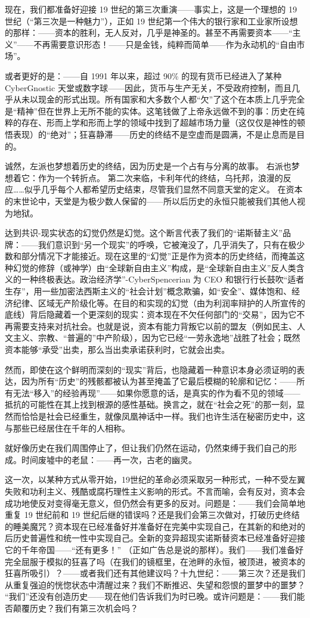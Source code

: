\documentclass[DIV=12,%
               BCOR=0mm,%
               headinclude=false,%
               footinclude=false,open=any,%
               fontsize=10pt,%
               oneside,%
               paper=210mm:11in]%
               {scrbook}
\begin{document}
现在，我们都准备好迎接 19 世纪的第三次重演——事实上，这是一个理想的 19 世纪（“第三次是一种魅力”），正如 19 世纪第一个伟大的银行家和工业家所设想的那样：——资本的胜利，无人反对，几乎是神圣的。甚至不再需要资本——“主义”——不再需要意识形态！——只是金钱，纯粹而简单——作为永动机的“自由市场”。


或者更好的是：——自 1991 年以来，超过 90\% 的现有货币已经进入了某种 Cyber​​Gnostic 天堂或数字球——因此，货币与生产无关，不受政府控制，而且几乎从未以现金的形式出现。所有国家和大多数个人都“欠”了这个在本质上几乎完全是“精神”但在世界上无所不能的实体。这笔钱做了上帝永远做不到的事：历史在纯粹的存在、形而上学和形而上学的领域中找到了超越市场力量（这仅仅是神性的顿悟表现）的“绝对”；狂喜静滞——历史的终结不是空虚而是圆满，不是止息而是目的。


诚然，左派也梦想着历史的终结，因为历史是一个占有与分离的故事。 右派也梦想着它：作为一个转折点。 第二次来临，卡利年代的终结，乌托邦，浪漫的反应\dots{}\dots{}似乎几乎每个人都希望历史结束，尽管我们显然不同意天堂的定义。 在资本的末世论中，天堂是为极少数人保留的——所以后历史的永恒只能被我们其他人视为地狱。


达到共识-现实状态的幻觉仍然是幻觉。这个断言代表了我们的“诺斯替主义”品牌：——我们意识到“另一个现实”的呼唤，它被淹没了，几乎消失了，只有在极少数和部分情况下才能接近。现在这里的“幻觉”正是作为资本的历史终结，而掩盖这种幻觉的修辞（或神学）由“全球新自由主义”构成，是“全球新自由主义”反人类含义的一种终极表达。政治经济学”-Cyber​​Spencerian 为 CEO 和银行行长鼓吹“适者生存”，用一些加密法西斯主义的“社会计划”概念欺骗，如“安全”、媒体饱和、经济纪律、区域无产阶级化等。在目的和实现的幻觉（由为利润率辩护的人所宣传的底线）背后隐藏着一个更深刻的现实：资本现在不欠任何部门的“交易”，因为它不再需要支持来对抗社会。也就是说，资本有能力背叛它以前的盟友（例如民主、人文主义、宗教、“普遍的”中产阶级），因为它已经“一劳永逸地”战胜了社会；既然资本能够“承受”出卖，那么当出卖承诺获利时，它就会出卖。


然而，即使在这个鲜明而深刻的“现实”背后，也隐藏着一种意识本身必须证明的表达，因为所有“历史”的残骸都被认为甚至掩盖了它最后模糊的轮廓和记忆：——所有无法“移入”的经验再现”——如果你愿意的话，是真实的作为看不见的领域——抵抗的可能性在其上找到根源的感性基础。换言之，就在“社会之死”的那一刻，显然而恰恰是社会已经重生，就像凤凰神话中一样。我们也许生活在秘密历史中，这与那些已经居住在千年的人相称。


就好像历史在我们周围停止了，但让我们仍然在运动，仍然束缚于我们自己的形成。时间废墟中的老鼠：——再一次，古老的幽灵。


这一次，以某种方式从零开始，19世纪的革命必须采取另一种形式，一种不受左翼失败和功利主义、残酷或腐朽理性主义影响的形式。不言而喻，会有反​​对，资本会成功地使反对变得毫无意义，但仍然会有更多的反对。问题是：——我们会简单地重复 19 世纪前和 19 世纪后继的错误吗？还是我们会第三次做对，打破历史终结的睡美魔咒？资本现在已经准备好并准备好在完美中实现自己，在其新的和绝对的后历史普遍性和统一性中实现自己。全新的变异超现实诺斯替资本已经准备好迎接它的千年帝国——“还有更多！” （正如广告总是说的那样）。我们——我们准备好完全屈服于模拟的狂喜了吗（在我们的镜框里，在池畔的永恒，被顶进，被资本的狂喜所吸引）？——或者我们还有其他建议吗？十九世纪：——第三次？还是我们从重复强迫的恍惚状态中清醒过来？我们不断推迟、失望和怨恨的噩梦中的噩梦？ “我们”还没有创造历史——现在他们告诉我们为时已晚。或许问题是：——我们能否颠覆历史？我们有第三次机会吗？
\end{document}
